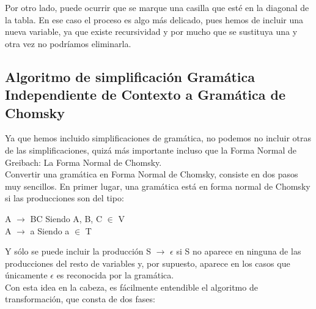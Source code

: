 \documentclass[12pt,a4paper,spanish]{book}
\begin{document}
Por otro lado, puede ocurrir que se marque una casilla que est\'e en la diagonal de la tabla. En ese caso el proceso es algo m\'as delicado, pues hemos de incluir una nueva variable, ya que existe recursividad y por mucho que se sustituya una y otra vez no podr\'iamos eliminarla.




\newpage
\subsection{Algoritmo de simplificaci\'on Gram\'atica Independiente de Contexto a Gram\'atica de Chomsky}
Ya que hemos incluido simplificaciones de gram\'atica, no podemos no incluir otras de las simplificaciones, quiz\'a m\'as importante incluso que la Forma Normal de Greibach: La Forma Normal de Chomsky.\\
\newline
Convertir una gram\'atica en Forma Normal de Chomsky, consiste en dos pasos muy sencillos. En primer lugar, una gram\'atica est\'a en forma normal de Chomsky si las producciones son del tipo:
\begin{center}
A $\rightarrow$ BC 	Siendo A, B, C $\in$ V\\
A $\rightarrow$ a        Siendo a $\in$  T
\end{center}
Y s\'olo se puede incluir la producci\'on S $\rightarrow$ $\epsilon$ si S no aparece en ninguna de las producciones del resto de variables y, por supuesto,  aparece en los casos que \'unicamente $\epsilon$ es reconocida por la gram\'atica.\\
\newline
Con esta idea en la cabeza, es f\'acilmente entendible el algoritmo de transformaci\'on, que consta de dos fases:
\end{document}
